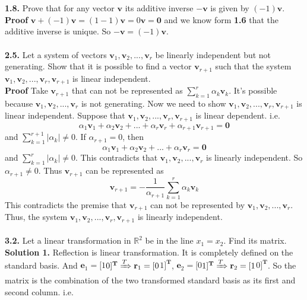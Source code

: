 \documentclass[11pt, a4paper]{article}
\begin{document}
\\
\\
\textbf{1.8.} Prove that for any vector $\textbf{v}$ its additive inverse $-\textbf{v}$ is given by $(-1)\textbf{v}$.
\\ 
\textbf{Proof} $\textbf{v} + (-1)\textbf{v} = (1-1)\textbf{v} = 0\textbf{v} = \textbf{0}$ and we know form \textbf{1.6} that the additive inverse is unique. So $-\textbf{v} = (-1)\textbf{v}$.
\\
\\
\textbf{2.5.} Let a system of vectors $\textbf{v$_1$},\textbf{v$_2$},...,\textbf{v$_r$}$ be linearly independent but not generating. Show that it is possible to find a vector $\textbf{v$_{r+1}$}$ such that the system $\textbf{v$_1$},\textbf{v$_2$},...,\textbf{v$_r$},\textbf{v$_{r+1}$}$ is linear independent.
\\
\textbf{Proof} Take $\textbf{v$_{r+1}$}$ that can not be represented as $\sum_{k=1}^r\alpha_k\textbf{v$_k$}$. It's possible because $\textbf{v$_1$},\textbf{v$_2$},...,\textbf{v$_r$}$ is not generating. Now we need to show $\textbf{v$_1$},\textbf{v$_2$},...,\textbf{v$_r$},\textbf{v$_{r+1}$}$ is linear independent. Suppose that $\textbf{v$_1$},\textbf{v$_2$},...,\textbf{v$_r$},\textbf{v$_{r+1}$}$ is linear dependent. i.e. $$\alpha_1\textbf{v$_1$}+\alpha_2\textbf{v$_2$}+...+\alpha_r\textbf{v$_r$}+\alpha_{r+1}\textbf{v$_{r+1}$}=\textbf{0}$$ and $\sum_{k=1}^{r+1}|\alpha_k|\neq0$. If $\alpha_{r+1}=0$, then $$\alpha_1\textbf{v$_1$}+\alpha_2\textbf{v$_2$}+...+\alpha_r\textbf{v$_r$}=\textbf{0}$$ and $\sum_{k=1}^r|\alpha_k|\neq0$. This contradicts that $\textbf{v$_1$},\textbf{v$_2$},...,\textbf{v$_r$}$ is linearly independent. So $\alpha_{r+1}\neq0$. Thus $\textbf{v$_{r+1}$}$ can be represented as $$\textbf{v$_{r+1}$}=-\frac{1}{\alpha_{r+1}}\sum_{k=1}^r\alpha_k\textbf{v$_k$}$$This contradicts the premise that $\textbf{v$_{r+1}$}$ can not be represented by $\textbf{v$_1$},\textbf{v$_2$},...,\textbf{v$_r$}$. Thus, the system $\textbf{v$_1$},\textbf{v$_2$},...,\textbf{v$_r$},\textbf{v$_{r+1}$}$ is linearly independent.
\\
\\
\textbf{3.2.} Let a linear transformation in $\mathbb{R}^2$ be in the line $x_1 = x_2$. Find its matrix.\\
\textbf{Solution 1.} Reflection is linear transformation. It is completely defined on the standard basis.  And $\textbf{e$_1$}=[1 $\:$ 0]^{\textbf{T}}\xRightarrow{T} \textbf{r$_1$}= [0 $\:$ 1]^{\textbf{T}}$, $\textbf{e$_2$}=[0 $\:$ 1]^{\textbf{T}}\xRightarrow{T} \textbf{r$_2$} = [1 $\:$ 0]^{\textbf{T}}$. So the matrix is the combination of the two transformed standard basis as its first and second column. i.e.
\end{document}
